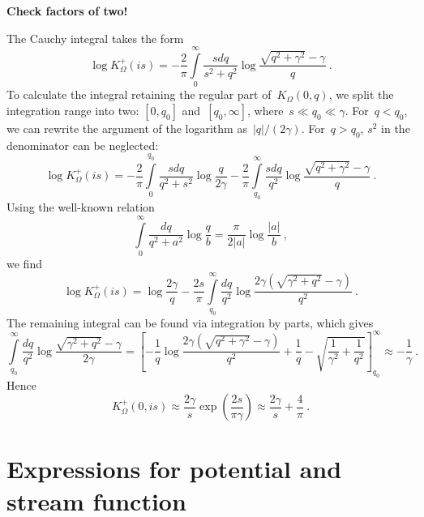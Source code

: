 \documentclass[preprint,aps,eqsecnum, prb]{revtex4-1}
\newcommand{\fplus}[1]{{#1}^{+}}
\begin{document}
\textbf{Check factors of two!}

The Cauchy
integral takes the form
\begin{equation}
  \log\fplus{K}_\Omega(is) = - \frac{2}{\pi}\int\limits_{0}^{\infty}
  \frac{s dq}{s^2 + q^2}
  \log\frac{\sqrt{q^2 + \gamma^2} - \gamma}{q}
  \ .
\end{equation}
To calculate the integral retaining the regular part of~$K_\Omega(0, q)$,
we split the integration range into two: $[0, q_0]$ and~$[q_0, \infty]$,
where~$s \ll q_0 \ll \gamma$. For~$q <  q_0$, we can
rewrite the argument of the logarithm as~$|q|/(2\gamma)$. For~$q > q_0$,
$s^2$ in the denominator can be neglected:
\begin{equation}
  \log\fplus{K}_\Omega(is) = - \frac{2}{\pi}
  \int\limits_{0}^{q_0} \frac{s dq}{q^2 + s^2} \log\frac{q}{2\gamma}
  - \frac{2}{\pi} \int\limits_{q_0}^{\infty}
  \frac{s dq}{q^2} \log\frac{\sqrt{q^2 + \gamma^2} - \gamma}{q}
  \ .
\end{equation}
Using the well-known relation\cite{bib:Gradstein}
\begin{equation}
  \int\limits_{0}^{\infty} \frac{dq}{q^2 + a^2} \log\frac{q}{b}
  = \frac{\pi}{2|a|} \log\frac{|a|}{b}
  \ ,
\end{equation}
we find
\begin{equation}
  \log\fplus{K}_\Omega(is) = \log\frac{2\gamma}{q}
  - \frac{2s}{\pi} \int\limits_{q_0}^{\infty}
  \frac{dq}{q^2} \log\frac{2\gamma\left(\sqrt{\gamma^2 + q^2}  - \gamma\right)}{q^2}
  \ .
\end{equation}
The remaining integral can be found via integration by parts,
which gives
\begin{equation}
  \int\limits_{q_0}^{\infty}
  \frac{dq}{q^2} \log\frac{\sqrt{\gamma^2 + q^2}  - \gamma}{2\gamma}
  = \left[-\frac{1}{q}\log\frac{2\gamma \left(\sqrt{q^2 + \gamma^2} - \gamma\right)}{q^2}
  + \frac{1}{q} - \sqrt{\frac{1}{\gamma^2} + \frac{1}{q^2}} \right]_{q_0}^{\infty}
\approx - \frac{1}{\gamma}
\ .
\end{equation}
Hence
\begin{equation}
  \fplus{K}_\Omega(0, is)
  \approx \frac{2\gamma}{s} \exp\left(\frac{2s}{\pi \gamma}\right)
  \approx \frac{2\gamma}{s} + \frac{4}{\pi}
 \ .
\end{equation}

\section{Expressions for potential and stream function}
\end{document}
